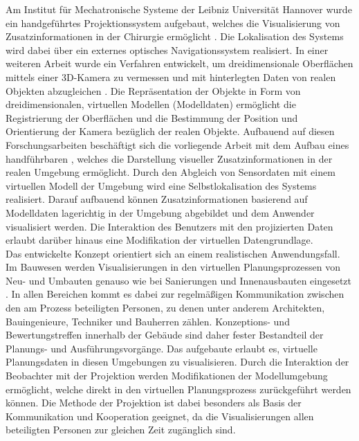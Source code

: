 Am Institut für Mechatronische Systeme der Leibniz Universität Hannover wurde ein handgeführtes Projektionssystem aufgebaut, welches die Visualisierung von Zusatzinformationen in der Chirurgie ermöglicht \cite{Kobler2010}. Die Lokalisation des Systems wird dabei über ein externes optisches Navigationssystem realisiert. In einer weiteren Arbeit wurde ein Verfahren entwickelt, um dreidimensionale Oberflächen mittels einer 3D-Kamera zu vermessen und mit hinterlegten Daten von realen Objekten abzugleichen \cite{Reese2013}. Die Repräsentation der Objekte in Form von dreidimensionalen, virtuellen Modellen (Modelldaten) ermöglicht die Registrierung der Oberflächen und die Bestimmung der Position und Orientierung der Kamera bezüglich der realen Objekte. Aufbauend auf diesen Forschungsarbeiten beschäftigt sich die vorliegende Arbeit mit dem Aufbau eines handführbaren , welches die Darstellung visueller Zusatzinformationen in der realen Umgebung ermöglicht. Durch den Abgleich von Sensordaten mit einem virtuellen Modell der Umgebung wird eine Selbstlokalisation des Systems realisiert. Darauf aufbauend können Zusatzinformationen basierend auf Modelldaten lagerichtig in der Umgebung abgebildet und dem Anwender visualisiert werden. Die Interaktion des Benutzers mit den projizierten Daten erlaubt darüber hinaus eine Modifikation der virtuellen Datengrundlage.\\

Das entwickelte Konzept orientiert sich an einem realistischen Anwendungsfall. Im Bauwesen werden Visualisierungen in den virtuellen Planungsprozessen von Neu- und Umbauten genauso wie bei Sanierungen und Innenausbauten eingesetzt \cite{Bouchlaghem2005}. In allen Bereichen kommt es dabei zur regelmäßigen Kommunikation zwischen den am Prozess beteiligten Personen, zu denen unter anderem Architekten, Bauingenieure, Techniker und Bauherren zählen. Konzeptions- und Bewertungstreffen innerhalb der Gebäude sind daher fester Bestandteil der Planungs- und Ausführungsvorgänge. Das aufgebaute \kps{} erlaubt es, virtuelle Planungsdaten in diesen Umgebungen zu visualisieren. Durch die Interaktion der Beobachter mit der Projektion werden Modifikationen der Modellumgebung ermöglicht, welche direkt in den virtuellen Planungsprozess zurückgeführt werden können. Die Methode der Projektion ist dabei besonders als Basis der Kommunikation und Kooperation geeignet, da die Visualisierungen allen beteiligten Personen zur gleichen Zeit zugänglich sind.\\

